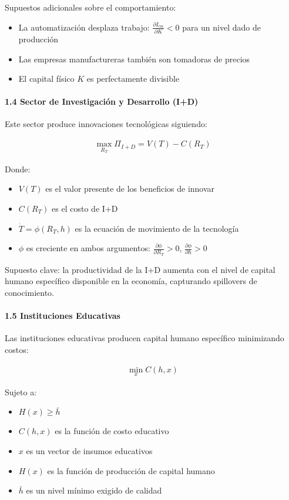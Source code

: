\documentclass{article}
\theoremstyle{remark}
\theoremstyle{definition}
\begin{document}
\begin{tcolorbox}
Supuestos adicionales sobre el comportamiento:
\begin{itemize}
\item La automatización desplaza trabajo: $\frac{\partial L_m}{\partial K} < 0$ para un nivel dado de producción
\item Las empresas manufactureras también son tomadoras de precios
\item El capital físico $K$ es perfectamente divisible
\end{itemize}

\paragraph{1.4 Sector de Investigación y Desarrollo (I+D)}
Este sector produce innovaciones tecnológicas siguiendo:

\begin{align}
\max_{R_T} \Pi_{I+D} = V(T) - C(R_T)
\end{align}

Donde:
\begin{itemize}
\item $V(T)$ es el valor presente de los beneficios de innovar
\item $C(R_T)$ es el costo de I+D
\item $\dot{T} = \phi(R_T, h)$ es la ecuación de movimiento de la tecnología
\item $\phi$ es creciente en ambos argumentos: $\frac{\partial \phi}{\partial R_T} > 0$, $\frac{\partial \phi}{\partial h} > 0$
\end{itemize}

Supuesto clave: la productividad de la I+D aumenta con el nivel de capital humano específico disponible en la economía, capturando spillovers de conocimiento.

\paragraph{1.5 Instituciones Educativas}
Las instituciones educativas producen capital humano específico minimizando costos:

\begin{align}
\min_{x} C(h, x)
\end{align}

Sujeto a:
\begin{itemize}
\item $H(x) \geq \bar{h}$
\item $C(h,x)$ es la función de costo educativo
\item $x$ es un vector de insumos educativos
\item $H(x)$ es la función de producción de capital humano
\item $\bar{h}$ es un nivel mínimo exigido de calidad
\end{itemize}


\end{tcolorbox}
\end{document}
